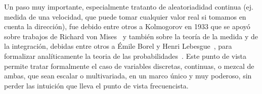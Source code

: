 {Un  paso  muy  importante,  especialmente tratanto  de  aleatoriadidad  continua
(ej. medida de una velocidad, que puede tomar cualquier valor real si tomamos en
cuenta  la direcci\'on),  fue debido  entre otros  a Kolmogorov  en 1933  que se
apoy\'o sobre  trabajos de Richard  von Mises~\cite{Mis32} y tambi\'en  sobre la
teor\'ia de la medida y de la integraci\'on, debidas entre otros a \'Emile Borel
y  Henri  Lebesgue~\cite{Bor98, Bor09,  Leb04,  Leb18,  Hal50}, para  formalizar
anal\'iticamente   la  teoria   de  las   probabilidades~\cite{Kol56,  BarNov78,
JacPro03}. Este punto  de vista permite tratar formalmente  el caso de variables
discretas, continuas, o mezcal de ambas,  que sean escalar o multivariada, en un
marco \'unico y  muy poderoso, sin perder las intuici\'on que  lleva el punto de
vista frecuencista.

}